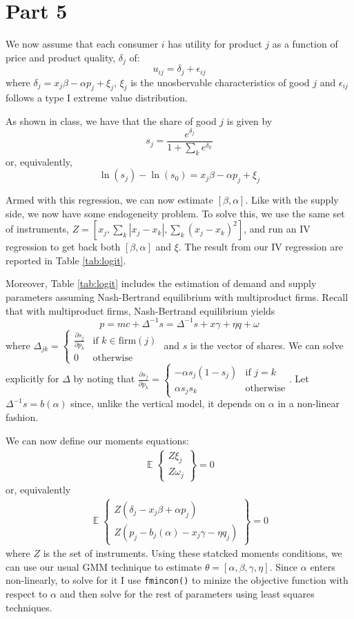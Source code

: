 \documentclass[12pt]{article}
\newcommand{\1}{{\bf 1}} %
\DeclareMathOperator{\E}{\mathbb{E}} %
\newcommand{\Ex}[1]{\E\left\{#1\right\}} %
\newcommand{\inv}{^{-1}}
\newcommand{\mat}[1]{\begin{matrix}#1\end{matrix}}
\begin{document}
\section*{Part 5}

We now assume that each consumer $i$ has utility for product $j$ as a function of price and product quality, $\delta_j$ of:
\[
u_{ij} =\delta_j +\epsilon_{ij}
\]
where $\delta_j = x_j\beta -\alpha p_j+\xi_j$, $\xi_j$ is the unosbervable characteristics of good $j$ and $\epsilon_{ij}$ follows a type I extreme value distribution.

As shown in class, we have that the share of good $j$ is given by
\[
s_j = \frac{e^{\delta_j }}{1+\sum_k e^{\delta_k}}
\]
or, equivalently,
\[
\ln(s_j)-\ln(s_0) = x_j\beta -\alpha p_j+\xi_j
\]

Armed with this regression, we can now estimate $[\beta, \alpha]$. Like with the supply side, we now have some endogeneity problem. To solve this, we use the same set of instruments, $Z = [x_j,\sum_k |x_j - x_k|, \sum_k (x_j - x_k)^2]$, and run an IV regression to get back both $[\beta, \alpha]$ and $\xi$. The result from our IV regression are reported in Table \ref{tab:logit}.

Moreover, Table  \ref{tab:logit} includes the estimation of demand and supply parameters assuming Nash-Bertrand equilibrium with multiproduct firms. Recall that with multiproduct firms, Nash-Bertrand equilibrium yields
\[
p = mc + \Delta\inv s  = \Delta\inv s + x\gamma +\eta q +\omega
\]
where $\Delta_{jk} = \left\{\mat{\frac{\partial s_j}{\partial p_k} & \text{if }k\in \text{firm}(j)\\ 0 & \text{otherwise}}\right.$ and $s$ is the vector of shares. We can solve explicitly for $\Delta$ by noting that $\frac{\partial s_j}{\partial p_k}= \left\{\mat{ -\alpha s_j(1-s_j) & \text{if } j= k\\ \alpha s_js_k & \text{otherwise}}\right.$. Let $\Delta\inv s = b(\alpha)$ since, unlike the vertical model, it depends on $\alpha$ in a non-linear fashion.

We can now define our moments equations:
\begin{align*}
	\Ex{\mat{Z\xi_j \\ Z\omega_j}} = 0
\end{align*}
or, equivalently
\begin{align*}
	\Ex{\mat{Z(\delta_j - x_j\beta +\alpha p_j) \\ Z(p_j-b_j(\alpha)-x_j\gamma -\eta q_j)}} = 0
\end{align*}
where $Z$ is the set of instruments. Using these statcked moments conditions, we can use our usual GMM technique to estimate $\theta = [\alpha, \beta, \gamma, \eta]$. Since $\alpha$ enters non-linearly, to solve for it I use \verb!fmincon()! to minize the objective function with respect to $\alpha$ and then solve for the rest of parameters using least squares techniques.
\end{document}
